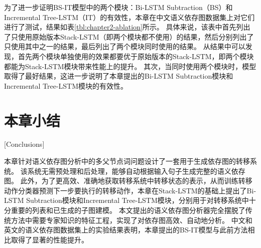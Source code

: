 为了进一步证明BS-IT模型中的两个模块：Bi-LSTM Subtraction（BS）和Incremental Tree-LSTM（IT）的有效性，本章在中文语义依存图数据集上对它们进行了测试，结果如表\ref{tbl:chapter2-ablation}所示。
具体来说，该表中首先列出了只使用原始版本Stack-LSTM（即两个模块都不使用）的结果，然后分别列出了只使用其中之一的结果，最后列出了两个模块同时使用的结果。
从结果中可以发现，首先两个模块单独使用的效果都要优于原始版本的Stack-LSTM，即两个模块都能为Stack-LSTM模块带来性能上的提升。
其次，当同时使用两个模块时，模型取得了最好结果，这进一步说明了本章提出的Bi-LSTM Subtraction模块和Incremental Tree-LSTM模块的有效性。

\section{本章小结}[Conclusions]

本章针对语义依存图分析中的多父节点词问题设计了一套用于生成依存图的转移系统。
该系统无需预处理和后处理，能够自动根据输入句子生成完整的语义依存图。
此外，为了更高效、准确地获取转移系统中转移状态的表示，从而训练转移动作分类器预测下一步要执行的转移动作，本章在Stack-LSTM的基础上提出了Bi-LSTM Subtraction模块和Incremental Tree-LSTM模块，分别用于对转移系统中十分重要的列表和已生成的子图建模。
本文提出的语义依存图分析器完全摆脱了传统方法中需要专家知识的特征工程，实现了对依存图高效、自动地分析。
中文和英文的语义依存图数据集上的实验结果表明，本章提出的BS-IT模型与此前方法相比取得了显著的性能提升。

